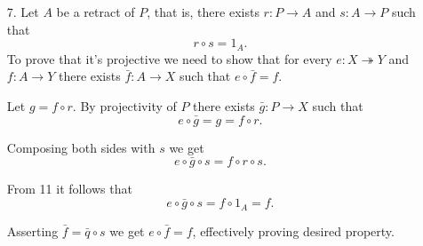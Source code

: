 \documentclass[12pt]{article}
\begin{document}
\begin{enumerate}
  \item[7.]
    Let $A$ be a retract of $P$, that is, there exists $r : P \to A$ and $s : A \to P$ such that \begin{equation}\label{eq:7rs=1} r \circ s = 1_A.\end{equation} To prove that it's projective we need to show that for every $e : X \twoheadrightarrow Y$ and $f : A \to Y$ there exists $\bar{f} : A \to X$ such that $e \circ \bar{f} = f$.

    Let $g = f \circ r$. By projectivity of $P$ there exists $\bar{g} : P \to X$ such that $$e \circ \bar{g} = g = f \circ r.$$

    Composing both sides with $s$ we get $$e \circ \bar{g} \circ s = f \circ r \circ s.$$

    From 11 it follows that $$e \circ \bar{g} \circ s = f \circ 1_A = f.$$

    Asserting $\bar{f} = \bar{q} \circ s$ we get $e \circ \bar{f} = f$, effectively proving desired property.

    \begin{figure}
      \centering
    \end{figure}



\end{enumerate}
\end{document}
